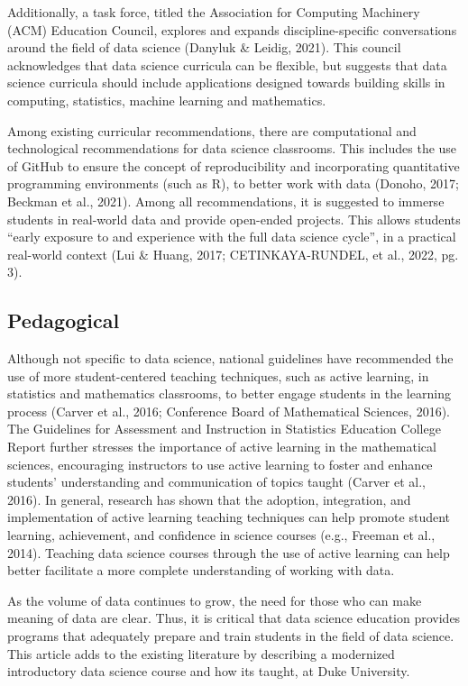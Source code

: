 \documentclass[
  12pt]{article}
\begin{document}
Additionally, a task force, titled the Association for Computing
Machinery (ACM) Education Council, explores and expands
discipline-specific conversations around the field of data science
(Danyluk \& Leidig, 2021). This council acknowledges that data science
curricula can be flexible, but suggests that data science curricula
should include applications designed towards building skills in
computing, statistics, machine learning and mathematics.

Among existing curricular recommendations, there are computational and
technological recommendations for data science classrooms. This includes
the use of GitHub to ensure the concept of reproducibility and
incorporating quantitative programming environments (such as R), to
better work with data (Donoho, 2017; Beckman et al., 2021). Among all
recommendations, it is suggested to immerse students in real-world data
and provide open-ended projects. This allows students ``early exposure
to and experience with the full data science cycle'', in a practical
real-world context (Lui \& Huang, 2017; CETINKAYA-RUNDEL, et al., 2022,
pg. 3).

\hypertarget{sec-ped}{%
\subsection{Pedagogical}\label{sec-ped}}

Although not specific to data science, national guidelines have
recommended the use of more student-centered teaching techniques, such
as active learning, in statistics and mathematics classrooms, to better
engage students in the learning process (Carver et al., 2016; Conference
Board of Mathematical Sciences, 2016). The Guidelines for Assessment and
Instruction in Statistics Education College Report further stresses the
importance of active learning in the mathematical sciences, encouraging
instructors to use active learning to foster and enhance students'
understanding and communication of topics taught (Carver et al., 2016).
In general, research has shown that the adoption, integration, and
implementation of active learning teaching techniques can help promote
student learning, achievement, and confidence in science courses (e.g.,
Freeman et al., 2014). Teaching data science courses through the use of
active learning can help better facilitate a more complete understanding
of working with data.

As the volume of data continues to grow, the need for those who can make
meaning of data are clear. Thus, it is critical that data science
education provides programs that adequately prepare and train students
in the field of data science. This article adds to the existing
literature by describing a modernized introductory data science course
and how its taught, at Duke University.


  
\end{document}
